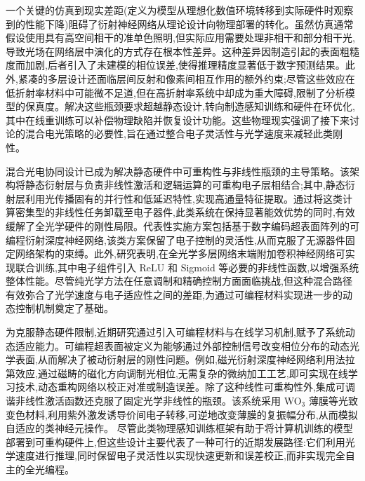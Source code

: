 一个关键的仿真到现实差距(定义为模型从理想化数值环境转移到实际硬件时观察到的性能下降)阻碍了衍射神经网络从理论设计向物理部署的转化。虽然仿真通常假设使用具有高空间相干的准单色照明,但实际应用需要处理非相干和部分相干光,导致光场在网络层中演化的方式存在根本性差异。\citep{doi_10_1364_oe_523619_ddeb1b53}这种差异因制造引起的表面粗糙度而加剧,后者引入了未建模的相位误差,使得推理精度显著低于数字预测结果。此外,紧凑的多层设计还面临层间反射和像素间相互作用的额外约束;尽管这些效应在低折射率材料中可能微不足道,但在高折射率系统中却成为重大障碍,限制了分析模型的保真度。解决这些瓶颈要求超越静态设计,转向制造感知训练和硬件在环优化,其中在线重训练可以补偿物理缺陷并恢复设计功能。这些物理现实强调了接下来讨论的混合电光策略的必要性,旨在通过整合电子灵活性与光学速度来减轻此类刚性。\citep{doi_10_1038_s41598_025_19638_8_1b2db1c9} \citep{doi_10_1364_oe_523619_ddeb1b53} \citep{doi_10_1109_dac56929_2023_10247715_f78d6713} \citep{doi_10_1364_ol_477605_b9242e3a}

混合光电协同设计已成为解决静态硬件中可重构性与非线性瓶颈的主导策略。该架构将静态衍射层与负责非线性激活和逻辑运算的可重构电子层相结合;其中,静态衍射层利用光传播固有的并行性和低延迟特性,实现高通量特征提取。通过将这类计算密集型的非线性任务卸载至电子器件,此类系统在保持显著能效优势的同时,有效缓解了全光学硬件的刚性局限。代表性实施方案包括基于数字编码超表面阵列的可编程衍射深度神经网络,该类方案保留了电子控制的灵活性,从而克服了无源器件固定网络架构的束缚。此外,研究表明,在全光学多层网络末端附加卷积神经网络可实现联合训练,其中电子组件引入 ReLU 和 Sigmoid 等必要的非线性函数,以增强系统整体性能。尽管纯光学方法在任意调制和精确控制方面面临挑战,但这种混合路径有效弥合了光学速度与电子适应性之间的差距,为通过可编程材料实现进一步的动态控制机制奠定了基础。\citep{doi_10_1038_s41928_022_00719_9_a2169947} \citep{doi_10_3390_nano14221812_4d7d91b1} \citep{doi_10_1038_s41928_022_00719_9_a2169947} \citep{doi_10_1126_sciadv_adu0904_786138ff}

为克服静态硬件限制,近期研究通过引入可编程材料与在线学习机制,赋予了系统动态适应能力。可编程超表面被定义为能够通过外部控制信号改变相位分布的动态光学表面,从而解决了被动衍射层的刚性问题。例如,磁光衍射深度神经网络利用法拉第效应,通过磁畴的磁化方向调制光相位,无需复杂的微纳加工工艺,即可实现在线学习技术,动态重构网络以校正对准或制造误差。除了这种线性可重构性外,集成可调谐非线性激活函数还克服了固定光学非线性的瓶颈。该系统采用 WO\(_{3}\) 薄膜等光致变色材料,利用紫外激发诱导价间电子转移,可逆地改变薄膜的复振幅分布,从而模拟自适应的类神经元操作。\citep{doi_10_1002_lpor_202500558_72fd7a4f} 尽管此类物理感知训练框架有助于将计算机训练的模型部署到可重构硬件上,但这些设计主要代表了一种可行的近期发展路径:它们利用光学速度进行推理,同时保留电子灵活性以实现快速更新和误差校正,而非实现完全自主的全光编程。\citep{s2_44f5e5b7573063092084a20caab78ea8a4e2407e_dd441649} \citep{doi_10_1002_lpor_202500558_72fd7a4f} \citep{doi_10_1002_lpor_202200348_d54cae18}

